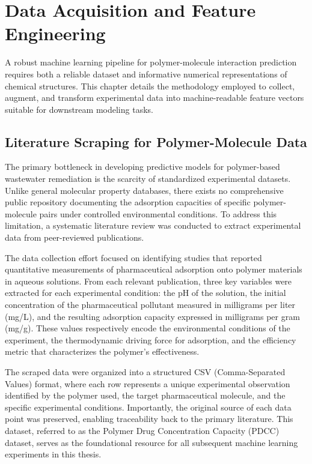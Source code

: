 \chapter{Data Acquisition and Feature Engineering}
\label{chap3}
A robust machine learning pipeline for polymer-molecule interaction prediction requires both a reliable dataset and informative numerical representations of chemical structures. This chapter details the methodology employed to collect, augment, and transform experimental data into machine-readable feature vectors suitable for downstream modeling tasks.

\section{Literature Scraping for Polymer-Molecule Data}
\label{sec:literature_scraping}

The primary bottleneck in developing predictive models for polymer-based wastewater remediation is the scarcity of standardized experimental datasets. Unlike general molecular property databases, there exists no comprehensive public repository documenting the adsorption capacities of specific polymer-molecule pairs under controlled environmental conditions. To address this limitation, a systematic literature review was conducted to extract experimental data from peer-reviewed publications.

The data collection effort focused on identifying studies that reported quantitative measurements of pharmaceutical adsorption onto polymer materials in aqueous solutions. From each relevant publication, three key variables were extracted for each experimental condition: the pH of the solution, the initial concentration of the pharmaceutical pollutant measured in milligrams per liter (mg/L), and the resulting adsorption capacity expressed in milligrams per gram (mg/g). These values respectively encode the environmental conditions of the experiment, the thermodynamic driving force for adsorption, and the efficiency metric that characterizes the polymer's effectiveness.

The scraped data were organized into a structured CSV (Comma-Separated Values) format, where each row represents a unique experimental observation identified by the polymer used, the target pharmaceutical molecule, and the specific experimental conditions. Importantly, the original source of each data point was preserved, enabling traceability back to the primary literature. This dataset, referred to as the Polymer Drug Concentration Capacity (PDCC) dataset, serves as the foundational resource for all subsequent machine learning experiments in this thesis.

